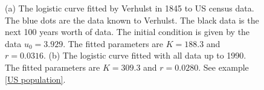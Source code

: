 \begin{figure}[!!!h!!!tb]
\centering
{}
\caption{(a) The logistic curve fitted by Verhulst in 1845 to US census data. The blue dots are the data known to Verhulst. The black data is the next 100 years worth of data.  The initial condition is given by the data $u_0=3.929$. The fitted parameters are $K=188.3$ and $r=0.0316$. (b) The logistic curve fitted with all data up to 1990. The fitted parameters are $K=309.3$ and $r=0.0280$. See example \ref{US population}. \label{US_population_prediction}}
\end{figure}

